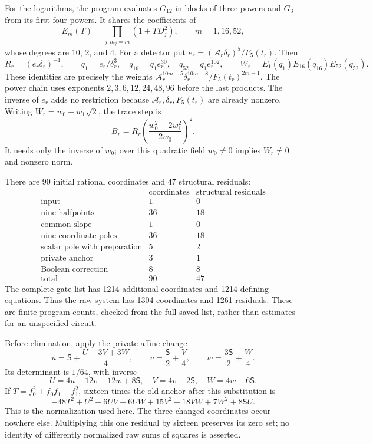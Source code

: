 \documentclass[11pt]{article}
\theoremstyle{definition}
\theoremstyle{remark}
\begin{document}
For the logarithms, the program evaluates $G_{12}$ in blocks of
three powers and $G_3$ from its first four powers. It shares the
coefficients of
\[
 E_m(T)=\prod_{j:m_j=m}(1+TD_j^2),\qquad m=1,16,52,
\]
whose degrees are 10, 2, and 4. For a detector put
$e_r=(\mathcal A_r\delta_r)^5/F_5(t_r)$. Then
\[
 R_r=(e_r\delta_r)^{-1},\qquad
 q_1=e_r/\delta_r^3,\quad q_{16}=q_1e_r^{30},\quad
 q_{52}=q_1e_r^{102},\qquad
 W_r=E_1(q_1)E_{16}(q_{16})E_{52}(q_{52}).
\]
These identities are precisely the weights
$\mathcal A_r^{10m-5}\delta_r^{10m-8}/F_5(t_r)^{2m-1}$.
The power chain uses exponents $2,3,6,12,24,48,96$ before the
last products. The inverse of $e_r$ adds no restriction because
$\mathcal A_r,\delta_r,F_5(t_r)$ are already nonzero.
Writing $W_r=w_0+w_1\sqrt2$, the trace step is
\[
 B_r=R_r\left(\frac{w_0^2-2w_1^2}{2w_0}\right)^2.
\]
It needs only the inverse of $w_0$; over this quadratic field
$w_0\ne0$ implies $W_r\ne0$ and nonzero norm.

There are 90 initial rational coordinates and 47 structural residuals:
\[
\begin{array}{l|r|r}
 &\text{coordinates}&\text{structural residuals}\\\hline
 \text{input}&1&0\\
 \text{nine halfpoints}&36&18\\
 \text{common slope}&1&0\\
 \text{nine coordinate poles}&36&18\\
 \text{scalar pole with preparation}&5&2\\
 \text{private anchor}&3&1\\
 \text{Boolean correction}&8&8\\\hline
 \text{total}&90&47
\end{array}
\]
The complete gate list has 1214 additional coordinates and 1214
defining equations. Thus the raw system has 1304 coordinates and
1261 residuals. These are finite program counts, checked from the
full saved list, rather than estimates for an unspecified circuit.

Before elimination, apply the private affine change
\begin{equation}\label{eq:v5-anchor-translation}
 u=\mathsf S+\frac{U-3V+3W}{4},\qquad
 v=\frac{\mathsf S}{2}+\frac V4,\qquad
 w=\frac{3\mathsf S}{2}+\frac W4.
\end{equation}
Its determinant is $1/64$, with inverse
\[
 U=4u+12v-12w+8\mathsf S,\quad V=4v-2\mathsf S,\quad
 W=4w-6\mathsf S.
\]
If $T=f_0^2+f_0f_1-f_1^2$, sixteen times the old anchor after this
substitution is
\begin{equation}\label{eq:v5-translated-anchor}
 -48T^2+U^2-6UV+6UW+15V^2-18VW+7W^2+8\mathsf S U.
\end{equation}
This is the normalization used here. The three changed coordinates
occur nowhere else. Multiplying this one residual by sixteen
preserves its zero set; no identity of differently normalized raw
sums of squares is asserted.
\end{document}
